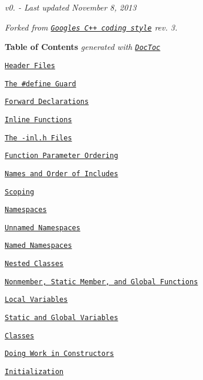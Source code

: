 {\itshape v0. -\/ Last updated November 8, 2013}

{\itshape Forked from \href{http://google-styleguide.googlecode.com/svn/trunk/cppguide.xml}{\tt Google\textquotesingle{}s C++ coding style} rev. 3.}

{\bfseries Table of Contents} {\itshape generated with \href{http://doctoc.herokuapp.com/}{\tt Doc\+Toc}}


\begin{DoxyItemize}
\item \href{#header-files}{\tt Header Files}
\begin{DoxyItemize}
\item \href{#the-define-guard}{\tt The \#define Guard}
\item \href{#forward-declarations}{\tt Forward Declarations}
\item \href{#inline-functions}{\tt Inline Functions}
\item \href{#the--inlh-files}{\tt The -\/inl.\+h Files}
\item \href{#function-parameter-ordering}{\tt Function Parameter Ordering}
\item \href{#names-and-order-of-includes}{\tt Names and Order of Includes}
\end{DoxyItemize}
\item \href{#scoping}{\tt Scoping}
\begin{DoxyItemize}
\item \href{#namespaces}{\tt Namespaces}
\begin{DoxyItemize}
\item \href{#unnamed-namespaces}{\tt Unnamed Namespaces}
\item \href{#named-namespaces}{\tt Named Namespaces}
\end{DoxyItemize}
\item \href{#nested-classes}{\tt Nested Classes}
\item \href{#nonmember-static-member-and-global-functions}{\tt Nonmember, Static Member, and Global Functions}
\item \href{#local-variables}{\tt Local Variables}
\item \href{#static-and-global-variables}{\tt Static and Global Variables}
\end{DoxyItemize}
\item \href{#classes}{\tt Classes}
\begin{DoxyItemize}
\item \href{#doing-work-in-constructors}{\tt Doing Work in Constructors}
\item \href{#initialization}{\tt Initialization}

\end{DoxyItemize}
\end{DoxyItemize}

